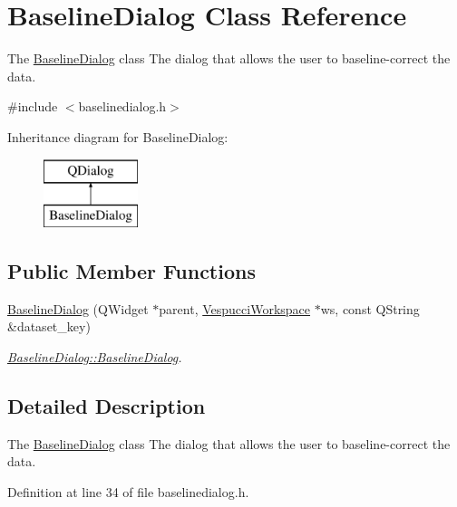 \hypertarget{class_baseline_dialog}{}\section{Baseline\+Dialog Class Reference}
\label{class_baseline_dialog}


The \hyperlink{class_baseline_dialog}{Baseline\+Dialog} class The dialog that allows the user to baseline-\/correct the data.  




{\ttfamily \#include $<$baselinedialog.\+h$>$}

Inheritance diagram for Baseline\+Dialog\+:\begin{figure}[H]
\begin{center}
\leavevmode
\includegraphics[height=2.000000cm]{class_baseline_dialog}
\end{center}
\end{figure}
\subsection*{Public Member Functions}
\begin{DoxyCompactItemize}
\item 
\hyperlink{class_baseline_dialog_ad7232611677ea102e9b81e9a0854774e}{Baseline\+Dialog} (Q\+Widget $\ast$parent, \hyperlink{class_vespucci_workspace}{Vespucci\+Workspace} $\ast$ws, const Q\+String \&dataset\+\_\+key)
\begin{DoxyCompactList}\small\item\em \hyperlink{class_baseline_dialog_ad7232611677ea102e9b81e9a0854774e}{Baseline\+Dialog\+::\+Baseline\+Dialog}. \end{DoxyCompactList}\end{DoxyCompactItemize}


\subsection{Detailed Description}
The \hyperlink{class_baseline_dialog}{Baseline\+Dialog} class The dialog that allows the user to baseline-\/correct the data. 

Definition at line 34 of file baselinedialog.\+h.



